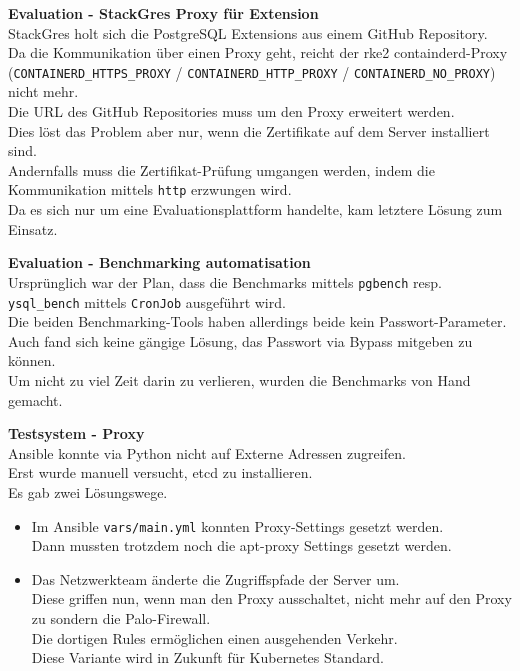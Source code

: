\begin{flushleft}
\begin{description}
        \item \textbf{Evaluation - StackGres Proxy für Extension}\hfill \\StackGres holt sich die PostgreSQL Extensions aus einem \Gls{GitHub} Repository.\\Da die Kommunikation über einen Proxy geht, reicht der \gls{rke2} containderd-Proxy (\texttt{CONTAINERD\_HTTPS\_PROXY} / \texttt{CONTAINERD\_HTTP\_PROXY} / \texttt{CONTAINERD\_NO\_PROXY}) nicht mehr.\\Die URL des \Gls{GitHub} Repositories muss um den Proxy erweitert werden.\\Dies löst das Problem aber nur, wenn die Zertifikate auf dem Server installiert sind.\\Andernfalls muss die Zertifikat-Prüfung umgangen werden, indem die Kommunikation mittels \texttt{http} erzwungen wird.\\Da es sich nur um eine Evaluationsplattform handelte, kam letztere Lösung zum Einsatz.
        \item \textbf{Evaluation - Benchmarking automatisation}\hfill \\Ursprünglich war der Plan, dass die Benchmarks mittels \texttt{pgbench} resp. \texttt{ysql\_bench} mittels \texttt{CronJob} ausgeführt wird.\\Die beiden Benchmarking-Tools haben allerdings beide kein Passwort-Parameter.\\Auch fand sich keine gängige Lösung, das Passwort via Bypass mitgeben zu können.\\Um nicht zu viel Zeit darin zu verlieren, wurden die Benchmarks von Hand gemacht.
        \item \textbf{Testsystem - Proxy}\hfill \\Ansible konnte via Python nicht auf Externe Adressen zugreifen.\\Erst wurde manuell versucht, etcd zu installieren.\\Es gab zwei Lösungswege.
        \begin{itemize}
            \item Im \Gls{Ansible} \texttt{vars/main.yml} konnten Proxy-Settings gesetzt werden.\\Dann mussten trotzdem noch die apt-proxy Settings gesetzt werden.
            \item Das Netzwerkteam änderte die Zugriffspfade der Server um.\\Diese griffen nun, wenn man den Proxy ausschaltet, nicht mehr auf den Proxy zu sondern die Palo-Firewall.\\Die dortigen Rules ermöglichen einen ausgehenden Verkehr.\\Diese Variante wird in Zukunft für \Gls{Kubernetes} Standard.
        \end{itemize}
    \end{description}
\end{flushleft}